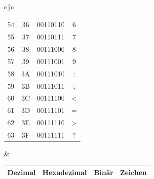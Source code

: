 \begin{table}[H]
{\begin{tabular}{c||c}
\begin{tabular}{cccc}
				54      & 36          & 00110110 & 6       \\
				55      & 37          & 00110111 & 7       \\
				56      & 38          & 00111000 & 8       \\
				57      & 39          & 00111001 & 9       \\
				58      & 3A          & 00111010 & :       \\
				59      & 3B          & 00111011 & ;       \\
				60      & 3C          & 00111100 & <       \\
				61      & 3D          & 00111101 & =       \\
				62      & 3E          & 00111110 & >       \\
				63      & 3F          & 00111111 & ?       \\\bottomrule
			\end{tabular} &
			\begin{tabular}{cccc}
				\toprule
				Dezimal & Hexadezimal & Binär    & Zeichen         \\
				\midrule


\end{tabular}
\end{tabular}}
\end{table}
